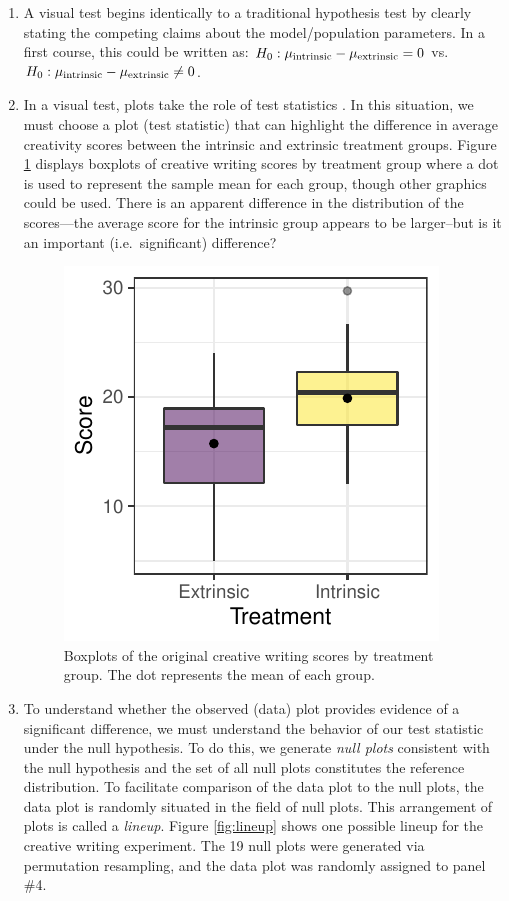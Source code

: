 \documentclass[12pt]{article}
\begin{document}
\begin{enumerate}
\def\labelenumi{\arabic{enumi}.}
\item
  A visual test begins identically to a traditional hypothesis test by
  clearly stating the competing claims about the model/population
  parameters. In a first course, this could be written as:
  \(H_0: \mu_{\rm intrinsic} - \mu_{\rm extrinsic} = 0\)
  vs.~\(H_0: \mu_{\rm intrinsic} - \mu_{\rm extrinsic} \ne 0\).
\item
  In a visual test, plots take the role of test statistics
  \citep{Buja-2009bd}. In this situation, we must choose a plot (test
  statistic) that can highlight the difference in average creativity
  scores between the intrinsic and extrinsic treatment groups. Figure
  \ref{fig:data_plot} displays boxplots of creative writing scores by
  treatment group where a dot is used to represent the sample mean for
  each group, though other graphics could be used. There is an apparent
  difference in the distribution of the scores---the average score for
  the intrinsic group appears to be larger--but is it an important
  (i.e.~significant) difference?

  \begin{figure}
  \centering
  \includegraphics{diff_means_plot.pdf}
  \caption{\label{fig:data_plot} Boxplots of the original creative
  writing scores by treatment group. The dot represents the mean of each
  group.}
  \end{figure}
\item
  To understand whether the observed (data) plot provides evidence of a
  significant difference, we must understand the behavior of our test
  statistic under the null hypothesis. To do this, we generate
  \emph{null plots} consistent with the null hypothesis and the set of
  all null plots constitutes the reference distribution. To facilitate
  comparison of the data plot to the null plots, the data plot is
  randomly situated in the field of null plots. This arrangement of
  plots is called a \emph{lineup}. Figure \ref{fig:lineup} shows one
  possible lineup for the creative writing experiment. The 19 null plots
  were generated via permutation resampling, and the data plot was
  randomly assigned to panel \#4.


\end{enumerate}
\end{document}

